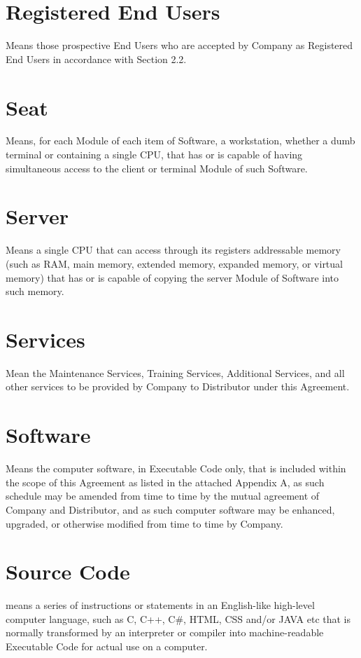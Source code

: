 \documentclass[letterpaper,10pt,english]{sphinxmanual}
\begin{document}
\section{Registered End Users}
\label{\detokenize{definitions:registered-end-users}}
Means those prospective End Users who are accepted by Company as Registered End Users in accordance with Section 2.2.


\section{Seat}
\label{\detokenize{definitions:seat}}
Means, for each Module of each item of Software, a workstation, whether a dumb terminal or containing a single CPU, that has or is capable of having simultaneous access to the client or terminal Module of such Software.


\section{Server}
\label{\detokenize{definitions:server}}
Means a single CPU that can access through its registers addressable memory (such as RAM, main memory, extended memory, expanded memory, or virtual memory) that has or is capable of copying the server Module of Software into such memory.


\section{Services}
\label{\detokenize{definitions:services}}
Mean the Maintenance Services, Training Services, Additional Services, and all other services to be provided by Company to Distributor under this Agreement.


\section{Software}
\label{\detokenize{definitions:software}}
Means the computer software, in Executable Code only, that is included within the scope of this Agreement as listed in the attached Appendix A, as such schedule may be amended from time to time by the mutual agreement of Company and Distributor, and as such computer software may be enhanced, upgraded, or otherwise modified from time to time by Company.


\section{Source Code}
\label{\detokenize{definitions:source-code}}
means a series of instructions or statements in an English-like high-level computer language, such as C, C++, C\#, HTML, CSS and/or JAVA etc that is normally transformed by an interpreter or compiler into machine-readable Executable Code for actual use on a computer.
\end{document}
